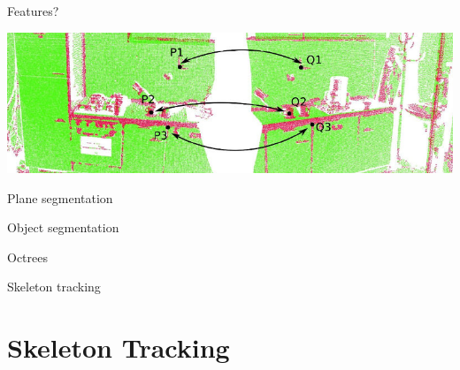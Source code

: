 \documentclass[compress]{beamer}
\begin{document}
{
\begin{frame}{Features?}
    \begin{center}
        \includegraphics[width=\linewidth]{good_features}
    \end{center}

\end{frame}
}

\begin{frame}{Plane segmentation}
\end{frame}

\begin{frame}{Object segmentation}
\end{frame}

\begin{frame}{Octrees}

\end{frame}

\begin{frame}{Skeleton tracking}
\end{frame}



\section{Skeleton Tracking}

\end{document}

